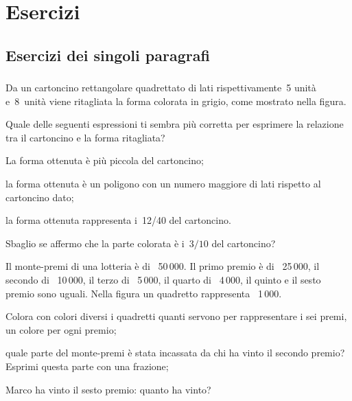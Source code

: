 
\section{Esercizi}

\subsection{Esercizi dei singoli paragrafi}

\subsubsection*{}

\begin{esercizio}
\label{ese:3.1}
Da un cartoncino rettangolare quadrettato di lati rispettivamente~5 unità 
e~8~unità viene ritagliata la forma colorata in grigio, come mostrato nella 
figura.
\begin{center}
 
\end{center}
Quale delle seguenti espressioni ti sembra più corretta per esprimere la 
relazione tra il cartoncino e la forma ritagliata?
\begin{enumeratea}
 \item La forma ottenuta è più piccola del cartoncino;
 \item la forma ottenuta è un poligono con un numero maggiore di lati rispetto 
 al cartoncino dato;  
 \item la forma ottenuta rappresenta i~12/40 del cartoncino.
\end{enumeratea}
Sbaglio se affermo che la parte colorata è i~$3/10$ del cartoncino?
\end{esercizio}

\begin{esercizio}
\label{ese:3.2}
Il monte-premi di una lotteria è di \officialeuro\ 50\,000. 
Il primo premio è di \officialeuro\ 25\,000, 
il secondo di \officialeuro\ 10\,000, 
il terzo di \officialeuro\ 5\,000, 
il quarto di \officialeuro\ 4\,000, 
il quinto e il sesto premio sono uguali.
Nella figura un quadretto rappresenta \officialeuro\ 1\,000.
\begin{center}
 
\end{center}
\begin{enumeratea}
 \item Colora con colori diversi i quadretti quanti servono per rappresentare 
 i sei premi, un colore per ogni premio;
 \item quale parte del monte-premi è stata incassata da chi ha vinto 
 il secondo premio? Esprimi questa parte con una frazione;
 \item Marco ha vinto il sesto premio: quanto ha vinto?
\end{enumeratea}
\end{esercizio}

